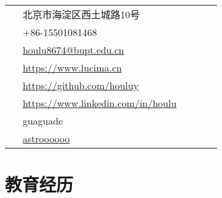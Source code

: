 \documentclass[10pt]{article} %
\begin{document}
\begin{paracol}{2}
	\parbox[top][0.12\textheight][c]{\linewidth}{ %
		\vspace{-0.04\textheight} %
		\colorbox{shade}{ %
			\begin{supertabular}{p{0.05\linewidth}|p{0.775\linewidth}} %
				\raisebox{-1pt}{\faHome} & 北京市海淀区西土城路10号 \\ %
				\raisebox{-1pt}{\faPhone} & +86-15501081468 \\ %
				\raisebox{0pt}{\small\faEnvelope} & \href{mailto:houlu8674@bupt.edu.cn}{houlu8674@bupt.edu.cn} \\ %
				\raisebox{-1pt}{\small\faDesktop} & \href{https://www.lucima.cn}{https://www.lucima.cn} \\ %
				\raisebox{-1pt}{\faGithub} & \href{https://github.com/houluy}{https://github.com/houluy} \\ %
				\raisebox{-1pt}{\faLinkedinSquare} & \href{https://www.linkedin.com/in/houlu}{https://www.linkedin.com/in/houlu} \\ %
				\raisebox{-1pt}{\faWechat} &
				guaguade \\
				\raisebox{-1pt}{\faWeibo} &
				\href{http://weibo.com/lucima}{astroooooo} \\
			\end{supertabular}
		}
	}
	
	
	\section{教育经历} 
	
	
	
	

\end{paracol}
\end{document}

